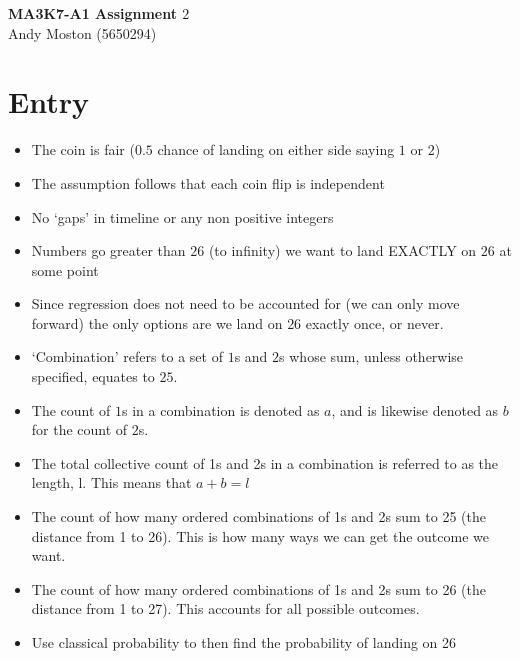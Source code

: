 \documentclass[11pt]{article}
\newcommand{\keywordfont}{\textsc}
\newcommand{\keyword}[1]{%
  \marginpar{\raggedright\small\keywordfont{#1}}}
\begin{document}
\Large
\begin{center}
\textbf{MA3K7-A1 Assignment $2$}
\\
Andy Moston (5650294)
\end{center}
\normalsize




\section{Entry}


\begin{itemize}

\item The coin is fair ($0.5$ chance of landing on either side saying $1$ or $2$)\keyword{I know}
\item The assumption follows that each coin flip is independent
\item No ‘gaps’ in timeline or any non positive integers
\item Numbers go greater than $26$ (to infinity) we want to land EXACTLY on $26$ at some point
\item Since regression does not need to be accounted for (we can only move forward) the only options are we land on $26$ exactly once, or never.\\
\end{itemize}

\begin{itemize}
\item ‘Combination’ refers to a set of $1$s and $2$s \keyword{Notation} whose sum, unless otherwise specified, equates to $25$. 
\item The count of $1$s in a combination is denoted as $a$, and is likewise denoted as $b$ for the count of $2$s.
\item The total collective count of 1s and 2s in a combination is referred to as the length, l. This means that $a+b = l$\\
\end{itemize}

\begin{itemize}
\item The count of how many ordered combinations of \keyword{I Want} 1s and 2s sum to 25 (the distance from 1 to 26). This is how many ways we can get the outcome we want.
\item The count of how many ordered combinations of 1s and 2s sum to 26 (the distance from 1 to 27). This accounts for all possible outcomes.
\item Use classical probability to then find the probability of landing on 26\\
\end{itemize}
\end{document}
